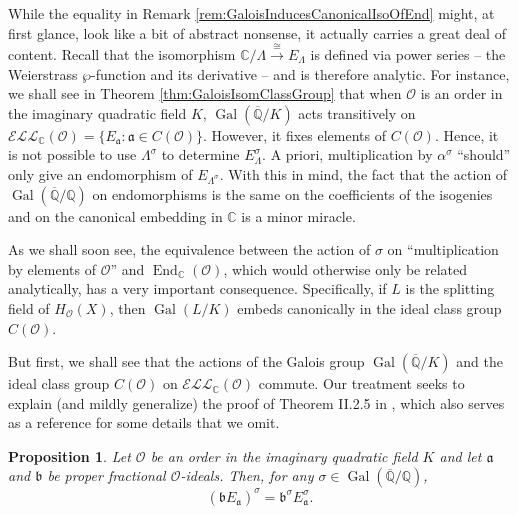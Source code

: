 \documentclass{amsart}
\newtheorem{prop}[thm]{Proposition}
\theoremstyle{definition}
\theoremstyle{remark}
\numberwithin{equation}{section}
\newcommand{\cE}{\mathcal E}
\newcommand{\cL}{\mathcal L}
\newcommand{\cO}{\mathcal O}
\newcommand{\fka}{\mathfrak a}
\newcommand{\fkb}{\mathfrak b}
\newcommand{\bbC}{\mathbb C}
\newcommand{\bbQ}{\mathbb Q}
\newcommand{\ELL}{\cE\cL\cL}
\DeclareMathOperator{\End}{End}
\DeclareMathOperator{\Gal}{Gal}
\begin{document}
  While the equality in Remark \ref{rem:GaloisInducesCanonicalIsoOfEnd} might, at first glance, look like a bit of abstract nonsense, it actually carries a great deal of content. Recall that the isomorphism $\bbC/\Lambda \overset{\cong}{\to} E_{\Lambda}$ is defined via power series -- the Weierstrass $\wp$-function and its derivative -- and is therefore analytic. For instance, we shall see in Theorem \ref{thm:GaloisIsomClassGroup} that
 when $\cO$ is an order in the imaginary quadratic field $K$, $ \Gal(\overline{\bbQ}/ K)$ acts transitively on $\ELL_{\bbC}(\cO) = \{E_{\fka}: \fka \in C(\cO)\}$. However, it fixes elements of $C(\cO)$. Hence, it is not possible to use $\Lambda^{\sigma}$ to determine $E_{\Lambda}^{\sigma}$. A priori, multiplication by $\alpha^\sigma$ ``should'' only give an endomorphism of $E_{\Lambda^{\sigma}}$.  
 With this in mind, the fact that the action of $\Gal(\overline{\bbQ}/\bbQ)$ on endomorphisms is the same on the coefficients of the isogenies and on the canonical embedding in $\bbC$ is a minor miracle.
  
 As we shall soon see, the equivalence between the action of $\sigma$ on ``multiplication by elements of $\cO$'' and $\End_{\bbC}(\cO)$, which would otherwise only be related analytically, has a very important consequence. Specifically, if $L$ is the splitting field of $H_{\cO}(X)$, then $\Gal(L/K)$ embeds canonically in the ideal class group $C(\cO)$. 
 
 But first, we shall see that the actions of the Galois group $ \Gal(\overline{\bbQ}/ K)$ and the ideal class group $C(\cO)$ on $\ELL_{\bbC}(\cO)$ commute. Our treatment seeks to explain (and mildly generalize) the proof of Theorem II.2.5 in \cite{SilvermanATAEC}, which also serves as a reference for some details that we omit.
  
 \begin{prop} \label{prop:GaloisAndClassGroupActionsCommute}
 Let $\cO$ be an order in the imaginary quadratic field $K$ and let $\fka$ and $\fkb$ be proper fractional $\cO$-ideals. Then, for any $\sigma \in  \Gal(\overline{\bbQ}/ \bbQ)$,
 \[
 (\fkb E_{\fka})^{\sigma} = \fkb^{\sigma} E_{\fka}^{\sigma}.
 \]
 \end{prop} 
 
\end{document}
